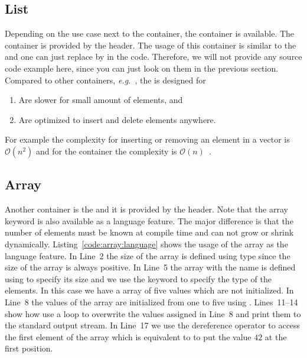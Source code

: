 \subsection{List}
Depending on the use case next to the  container, the  container is available. The  container is provided by the  header. The usage of this container is similar to the  and one can just replace  by  in the code. Therefore, we will not provide any source code example here, since you can just look on them in the previous section. Compared to other containers, \emph{e.g.}\ , the  is designed for
\begin{enumerate}
\item Are slower for small amount of elements, and
\item Are optimized to insert and delete elements anywhere.
\end{enumerate}
For example the complexity for inserting or removing an element in a vector is $\mathcal{O}(n^2)$ and for the container  the complexity is $\mathcal{O}(n)$~\cite{michalewicz2013genetic,knuth1997art}.

\subsection{Array}
Another container is the  and it is provided by the  header. Note that the array keyword is also available as a language feature. The major difference is that the number of elements must be known at compile time and can not grow or shrink dynamically. Listing~\ref{code:array:language} shows the usage of the array as the language feature. In Line~2 the size of the array is defined using  type since the size of the array is always positive. In Line~5  the array with the name  is defined using \cpp{[size]} to specify its size and we use the keyword  to specify the type of the elements. In this case we have a array of five  values which are not initialized. In Line~8 the values of the array are initialized from one to five using . Lines~11--14 show how use a  loop to overwrite the values assigned in Line~8 and print them to the standard output stream. In Line~17 we use the dereference operator \cpp{*} to access the first element of the array which is equivalent to  to put the value $42$ at the first position.\\

